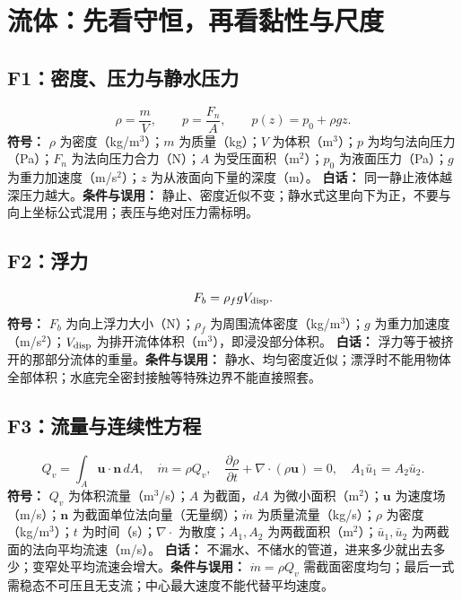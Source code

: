 \section{流体：先看守恒，再看黏性与尺度}
\subsection{F1：密度、压力与静水压力}
\begin{equation}
\rho=\frac mV,\qquad p=\frac{F_n}{A},\qquad p(z)=p_0+\rho gz.
\end{equation}
\textbf{符号：} $\rho$ 为密度（kg/m$^3$）；$m$ 为质量（kg）；$V$ 为体积（m$^3$）；$p$ 为均匀法向压力（Pa）；$F_n$ 为法向压力合力（N）；$A$ 为受压面积（m$^2$）；$p_0$ 为液面压力（Pa）；$g$ 为重力加速度（m/s$^2$）；$z$ 为从液面向下量的深度（m）。
\textbf{白话：} 同一静止液体越深压力越大。\textbf{条件与误用：} 静止、密度近似不变；静水式这里向下为正，不要与向上坐标公式混用；表压与绝对压力需标明。

\subsection{F2：浮力}
\begin{equation}
F_b=\rho_f gV_{\rm disp}.
\end{equation}
\textbf{符号：} $F_b$ 为向上浮力大小（N）；$\rho_f$ 为周围流体密度（kg/m$^3$）；$g$ 为重力加速度（m/s$^2$）；$V_{\rm disp}$ 为排开流体体积（m$^3$），即浸没部分体积。
\textbf{白话：} 浮力等于被挤开的那部分流体的重量。\textbf{条件与误用：} 静水、均匀密度近似；漂浮时不能用物体全部体积；水底完全密封接触等特殊边界不能直接照套。

\subsection{F3：流量与连续性方程}
\begin{equation}
Q_v=\int_A\mathbf u\cdot\mathbf n\,dA,\quad \dot m=\rho Q_v,\quad \frac{\partial\rho}{\partial t}+\nabla\cdot(\rho\mathbf u)=0,\quad A_1\bar u_1=A_2\bar u_2.
\end{equation}
\textbf{符号：} $Q_v$ 为体积流量（m$^3$/s）；$A$ 为截面，$dA$ 为微小面积（m$^2$）；$\mathbf u$ 为速度场（m/s）；$\mathbf n$ 为截面单位法向量（无量纲）；$\dot m$ 为质量流量（kg/s）；$\rho$ 为密度（kg/m$^3$）；$t$ 为时间（s）；$\nabla\cdot$ 为散度；$A_1,A_2$ 为两截面积（m$^2$）；$\bar u_1,\bar u_2$ 为两截面的法向平均流速（m/s）。
\textbf{白话：} 不漏水、不储水的管道，进来多少就出去多少；变窄处平均流速会增大。\textbf{条件与误用：} $\dot m=\rho Q_v$ 需截面密度均匀；最后一式需稳态不可压且无支流；中心最大速度不能代替平均速度。

